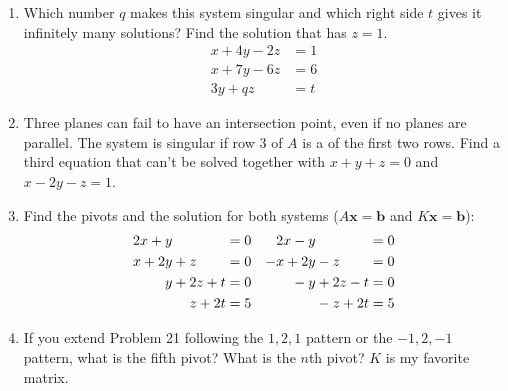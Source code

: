 \documentclass[14pt, a4paper]{article}
\begin{document}
\begin{enumerate}[resume]
    \item Which number $q$ makes this system singular and which right side $t$ gives it infinitely many solutions? Find the solution that has $z = 1$.
          \[
              \begin{aligned}
                  x + 4y - 2z & = 1 \\
                  x + 7y - 6z & = 6 \\
                  3y + qz     & = t
              \end{aligned}
          \]

    \item Three planes can fail to have an intersection point, even if no planes are parallel. The system is singular if row 3 of $A$ is a \underline{\hspace{3em}} of the first two rows. Find a third equation that can't be solved together with $x + y + z = 0$ and $x - 2y - z = 1$.

    \item Find the pivots and the solution for both systems ($A\boldsymbol{x} = \boldsymbol{b}$ and $K\boldsymbol{x} = \boldsymbol{b}$):
          \[
              \begin{array}{c@{\quad}c}
                  \begin{aligned}
                      2x + y \phantom{{}+z} \phantom{{}+2t} & = 0 \\
                      x + 2y + z \phantom{{}+2t}            & = 0 \\
                      y + 2z + t                            & = 0 \\
                      z + 2t                                & = 5
                  \end{aligned}
                   &
                  \begin{aligned}
                      2x - y \phantom{{}+z} \phantom{{}+2t} & = 0 \\
                      -x + 2y - z \phantom{{}+2t}           & = 0 \\
                      \phantom{x} - y + 2z - t              & = 0 \\
                      \phantom{x+y} - z + 2t                & = 5
                  \end{aligned}
              \end{array}
          \]

    \item If you extend Problem 21 following the $1,2,1$ pattern or the $-1,2,-1$ pattern, what is the fifth pivot? What is the $n$th pivot? $K$ is my favorite matrix.


\end{enumerate}
\end{document}

